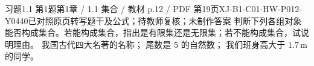 \par\noindent\begin{minipage}{\linewidth}
\begin{bankitem}{习题1.1 第1题}{第1章 / 1.1 集合 / 教材 p.12 / PDF 第19页}{XJ-B1-C01-HW-P012-Y0440}{已对照原页转写题干及公式；待教师复核；未制作答案}
判断下列各组对象能否构成集合。若能构成集合，指出是有限集还是无限集；若不能构成集合，试说明理由。
我国古代四大名著的名称；
尾数是 5 的自然数；
我们班身高大于 $1.7\,\mathrm m$ 的同学。
\end{bankitem}
\end{minipage}\par\medskip
